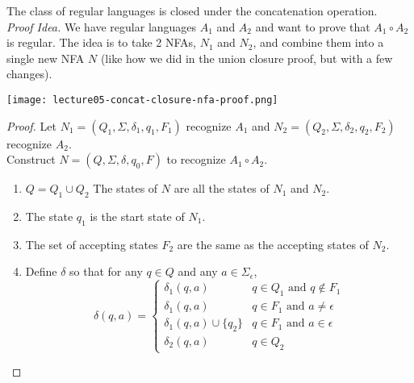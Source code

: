 \documentclass[11pt,a4paper]{article}
\begin{document}
\begin{theorem}
    The class of regular languages is closed under the concatenation operation. \\

    \textit{Proof Idea.} We have regular languages $A_1$ and $A_2$ and want to prove that $A_1\circ A_2$ is regular.
    The idea is to take 2 NFAs, $N_1$ and $N_2$, and combine them into a single new NFA $N$ (like how we did in the union closure proof, but with a few changes).

    \texttt{[image: lecture05-concat-closure-nfa-proof.png]}

    \begin{proof}
        Let $N_1=(Q_1,\Sigma,\delta_1,q_1,F_1)$ recognize $A_1$ and $N_2=(Q_2,\Sigma,\delta_2,q_2,F_2)$ recognize $A_2$. \\

        Construct $N=(Q,\Sigma,\delta,q_0,F)$ to recognize $A_1\circ A_2$.

        \begin{enumerate}
            \item $Q=Q_1\cup Q_2$
            \subitem The states of $N$ are all the states of $N_1$ and $N_2$.
            \item The state $q_1$ is the start state of $N_1$.
            \item The set of accepting states $F_2$ are the same as the accepting states of $N_2$.
            \item Define $\delta$ so that for any $q\in Q$ and any $a\in\Sigma_{\epsilon}$,
            $$\delta(q,a)=\begin{cases}
                \delta_1(q,a) & q\in Q_1\text{ and }q\notin F_1 \\
                \delta_1(q,a) & q\in F_1\text{ and }a\neq\epsilon \\
                \delta_1(q,a)\cup\{q_2\} & q\in F_1\text{ and }a\in\epsilon \\
                \delta_2(q,a) & q\in Q_2
            \end{cases}$$
        \end{enumerate}
    \end{proof}
\end{theorem}
\end{document}
